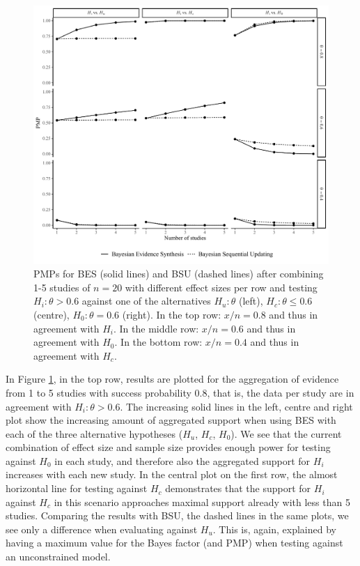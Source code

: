 \documentclass[11pt,reqno]{article}
\begin{document}
\begin{figure}[!ht]
   \centerline{\includegraphics[width=14cm]{r-files-bes-klugkist-volker-2022/Figures/bes_bsu_pmp}}
 \caption{PMPs for BES (solid lines) and BSU (dashed lines) after combining 1-5 studies of $n=20$ with different effect sizes per row and testing $H_i: \theta>0.6$ against one of the alternatives $H_u: \theta$ (left), $H_c: \theta \leq 0.6$ (centre), $H_0: \theta=0.6$ (right). In the top row: $x/n=0.8$ and thus in agreement with $H_i$. In the middle row: $x/n=0.6$ and thus in agreement with $H_0$. In the bottom row: $x/n=0.4$ and thus in agreement with $H_c$.}
 \label{aggre2}
\end{figure}

In Figure \ref{aggre2}, in the top row, results are plotted for the aggregation of evidence from 1 to 5 studies with success probability 0.8, that is, the data per study are in agreement with $H_i: \theta>0.6$. The increasing solid lines in the left, centre and right plot show the increasing amount of aggregated support when using BES with each of the three alternative hypotheses ($H_u$, $H_c$, $H_0$). We see that the current combination of effect size and sample size provides enough power for testing against $H_0$ in each study, and therefore also the aggregated support for $H_i$ increases with each new study. In the central plot on the first row, the almost horizontal line for testing against $H_c$ demonstrates that the support for $H_i$ against $H_c$ in this scenario approaches maximal support already with less than 5 studies.
Comparing the results with BSU, the dashed lines in the same plots, we see only a difference when evaluating against $H_u$. This is, again, explained by having a maximum value for the Bayes factor (and PMP) when testing against an unconstrained model.
\end{document}
